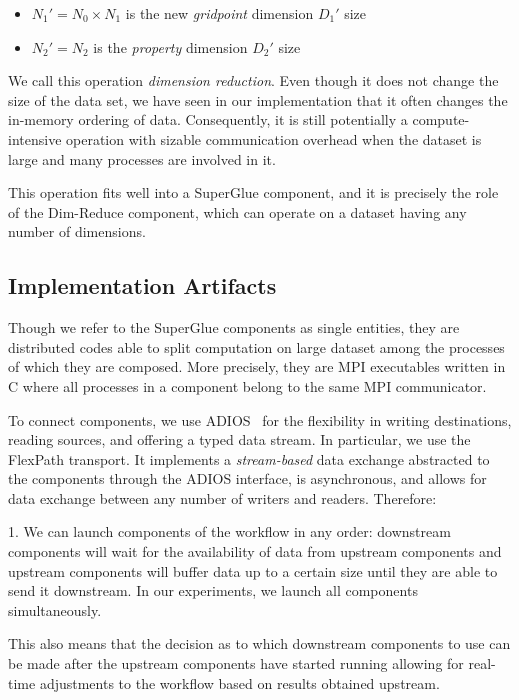 \begin{itemize}

\item $N_1' = N_0{\times}N_1$ is the new {\em gridpoint} dimension $D_1'$ size

\item $N_2' = N_2$ is the {\em property} dimension $D_2'$ size

\end{itemize}

We call this operation {\em dimension reduction}.
Even though it does not
change the size of the data set, we have seen in our implementation 
that it often changes the in-memory
ordering of data. Consequently, it is still potentially a
compute-intensive operation with sizable communication overhead
when the dataset is large and many
processes are involved in it.

This operation fits well into a
SuperGlue component, and it is precisely
the role of the Dim-Reduce
component, which can operate on a dataset having
any number of dimensions.

\subsection{Implementation Artifacts}

Though we refer to the SuperGlue components as single entities,
they are distributed
codes able to split computation on large dataset
among the processes of which they are
composed. More precisely, they are MPI executables written in C
where all processes in a component belong to the
same MPI communicator.

To connect components, we use
ADIOS~\cite{lofstead:2009:adaptable}
for the flexibility in writing destinations,
reading sources, and offering a
typed data stream. In particular, we use
the FlexPath transport. It implements
a {\em stream-based} data exchange abstracted to
the components through the
ADIOS interface, is asynchronous, and allows for
data exchange between any
number of writers and readers. Therefore:

1. We can launch components of the workflow
in any order: downstream components
will wait for the availability of data from
upstream components and upstream
components will buffer data up to a certain
size until they are able to send it
downstream. In our experiments,
we launch all components simultaneously.

This also means that the decision as to
which downstream components to use can be made after
the upstream components have started
running allowing for real-time adjustments to the
workflow based on results obtained upstream.
\fi

